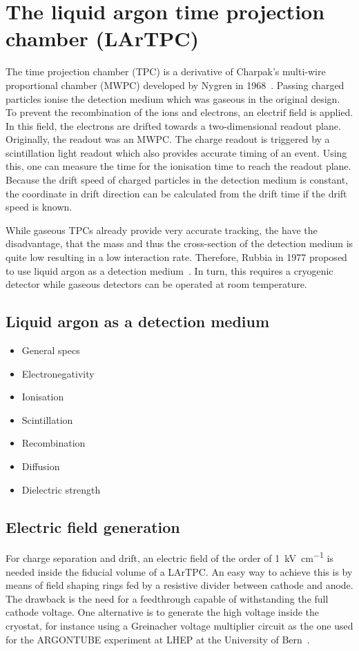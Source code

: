 \chapter{The liquid argon time projection chamber (LArTPC)\label{chap:lartpc}}
The time projection chamber (TPC) is a derivative of Charpak's multi-wire proportional chamber (MWPC)\cite{mwpc} developed by Nygren in 1968~\cite{sauce}.
Passing charged particles ionise the detection medium which was gaseous in the original design.
To prevent the recombination of the ions and electrons, an electrif field is applied.
In this field, the electrons are drifted towards a two-dimensional readout plane.
Originally, the readout was an MWPC.
The charge readout is triggered by a scintillation light readout which also provides accurate timing of an event.
Using this, one can measure the time for the ionisation time to reach the readout plane.
Because the drift speed of charged particles in the detection medium is constant, the coordinate in drift direction can be calculated from the drift time if the drift speed is known.

While gaseous TPCs already provide very accurate tracking, the have the disadvantage, that the mass and thus the cross-section of the detection medium is quite low resulting in a low interaction rate.
Therefore, Rubbia in 1977 proposed to use liquid argon as a detection medium~\cite{lartpc}.
In turn, this requires a cryogenic detector while gaseous detectors can be operated at room temperature.


\section{Liquid argon as a detection medium\label{sec:lartpc_lar}}
\begin{itemize}
	\item General specs
	\item Electronegativity
	\item Ionisation
	\item Scintillation
	\item Recombination
	\item Diffusion
	\item Dielectric strength
\end{itemize}
\cite{NobleGasDetectors}


\section{Electric field generation\label{sec:lartpc_efield}}
For charge separation and drift, an electric field of the order of \SI{1}{\kilo\volt\per\centi\metre} is needed inside the fiducial volume of a LArTPC.
An easy way to achieve this is by means of field shaping rings fed by a resistive divider between cathode and anode.
The drawback is the need for a feedthrough capable of withstanding the full cathode voltage.
One alternative is to generate the high voltage inside the cryostat, for instance using a Greinacher voltage multiplier circuit as the one used for the ARGONTUBE experiment at LHEP at the University of Bern~\cite{AT}.


